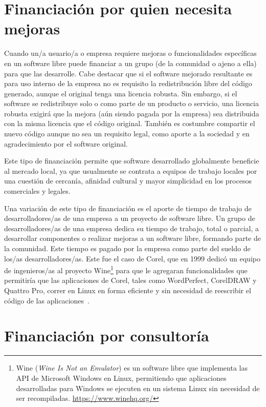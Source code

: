 \section{Financiación por quien necesita mejoras}

Cuando un/a usuario/a o empresa requiere mejoras o funcionalidades específicas en un software libre puede financiar a un grupo (de la comunidad o ajeno a ella) para que las desarrolle. Cabe destacar que si el software mejorado resultante es para uso interno de la empresa no es requisito la redistribución libre del código generado, aunque el original tenga una licencia robusta. Sin embargo, si el software se redistribuye solo o como parte de un producto o servicio, una licencia robusta exigirá que la mejora (aún siendo pagada por la empresa) sea distribuida con la misma licencia que el código original. También es costumbre compartir el nuevo código aunque no sea un requisito legal, como aporte a la sociedad y en agradecimiento por el software original.

Este tipo de financiación permite que software desarrollado globalmente beneficie al mercado local, ya que usualmente se contrata a equipos de trabajo locales por una cuestión de cercanía, afinidad cultural y mayor simplicidad en los procesos comerciales y legales.

Una variación de este tipo de financiación es el aporte de tiempo de trabajo de desarrolladores/as de una empresa a un proyecto de software libre. Un grupo de desarrolladores/as de una empresa dedica su tiempo de trabajo, total o parcial, a desarrollar componentes o realizar mejoras a un software libre, formando parte de la comunidad. Este tiempo es pagado por la empresa como parte del sueldo de los/as desarrolladores/as. Este fue el caso de Corel, que en 1999 dedicó un equipo de ingenieros/as al proyecto Wine\footnote{Wine (\emph{Wine Is Not an Emulator}) es un software libre que implementa las API de Microsoft Windows en Linux, permitiendo que  aplicaciones desarrolladas para Windows se ejecuten en un sistema Linux sin necesidad de ser recompiladas. \url{https://www.winehq.org/}} para que le agregaran funcionalidades que permitiría que las aplicaciones de Corel, tales como WordPerfect, CorelDRAW y Quattro Pro, correr en Linux en forma eficiente y sin necesidad de reescribir el código de las aplicaciones~\cite{corel99}.

\section{Financiación por consultoría}

